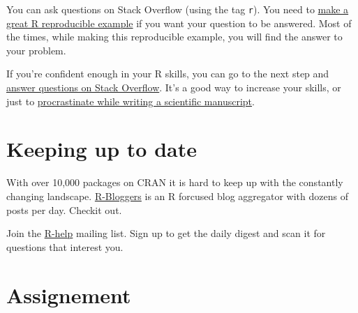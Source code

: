 \documentclass[]{book}
\theoremstyle{definition}
\theoremstyle{definition}
\theoremstyle{definition}
\theoremstyle{remark}
\begin{document}
You can ask questions on Stack Overflow (using the tag \texttt{r}). You
need to
\href{https://stackoverflow.com/questions/5963269/how-to-make-a-great-r-reproducible-example}{make
a great R reproducible example} if you want your question to be
answered. Most of the times, while making this reproducible example, you
will find the answer to your problem.

If you're confident enough in your R skills, you can go to the next step
and
\href{https://stackoverflow.com/unanswered/tagged/r?tab=newest}{answer
questions on Stack Overflow}. It's a good way to increase your skills,
or just to
\href{https://privefl.github.io/blog/one-month-as-a-procrastinator-on-stack-overflow/}{procrastinate
while writing a scientific manuscript}.

\section{Keeping up to date}\label{keeping-up-to-date}

With over 10,000 packages on CRAN it is hard to keep up with the
constantly changing landscape.
\href{https://www.r-bloggers.com/}{R-Bloggers} is an R forcused blog
aggregator with dozens of posts per day. Checkit out.

Join the \href{https://www.r-project.org/mail.html}{R-help} mailing
list. Sign up to get the daily digest and scan it for questions that
interest you.

\section{Assignement}\label{assignement}
\end{document}
